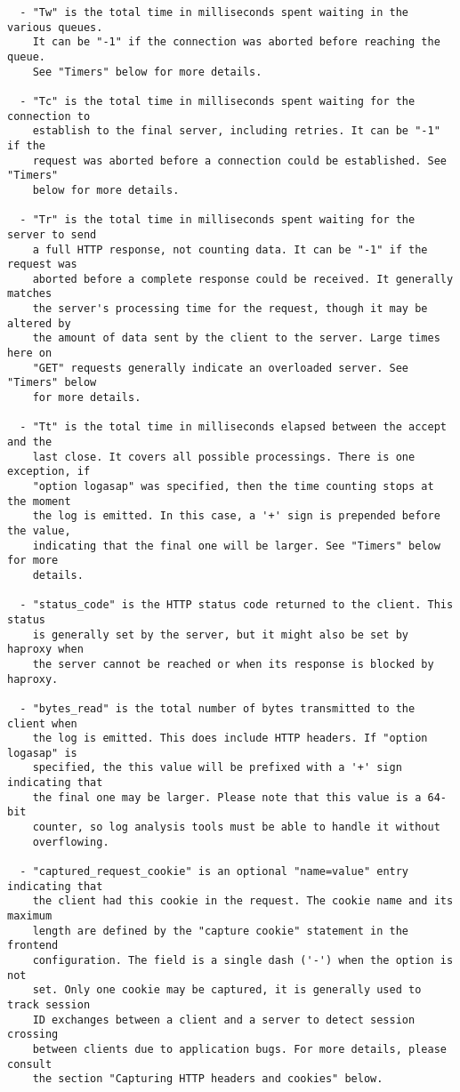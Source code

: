 \begin{verbatim}
  - "Tw" is the total time in milliseconds spent waiting in the various queues.
    It can be "-1" if the connection was aborted before reaching the queue.
    See "Timers" below for more details.

  - "Tc" is the total time in milliseconds spent waiting for the connection to
    establish to the final server, including retries. It can be "-1" if the
    request was aborted before a connection could be established. See "Timers"
    below for more details.

  - "Tr" is the total time in milliseconds spent waiting for the server to send
    a full HTTP response, not counting data. It can be "-1" if the request was
    aborted before a complete response could be received. It generally matches
    the server's processing time for the request, though it may be altered by
    the amount of data sent by the client to the server. Large times here on
    "GET" requests generally indicate an overloaded server. See "Timers" below
    for more details.

  - "Tt" is the total time in milliseconds elapsed between the accept and the
    last close. It covers all possible processings. There is one exception, if
    "option logasap" was specified, then the time counting stops at the moment
    the log is emitted. In this case, a '+' sign is prepended before the value,
    indicating that the final one will be larger. See "Timers" below for more
    details.

  - "status_code" is the HTTP status code returned to the client. This status
    is generally set by the server, but it might also be set by haproxy when
    the server cannot be reached or when its response is blocked by haproxy.

  - "bytes_read" is the total number of bytes transmitted to the client when
    the log is emitted. This does include HTTP headers. If "option logasap" is
    specified, the this value will be prefixed with a '+' sign indicating that
    the final one may be larger. Please note that this value is a 64-bit
    counter, so log analysis tools must be able to handle it without
    overflowing.

  - "captured_request_cookie" is an optional "name=value" entry indicating that
    the client had this cookie in the request. The cookie name and its maximum
    length are defined by the "capture cookie" statement in the frontend
    configuration. The field is a single dash ('-') when the option is not
    set. Only one cookie may be captured, it is generally used to track session
    ID exchanges between a client and a server to detect session crossing
    between clients due to application bugs. For more details, please consult
    the section "Capturing HTTP headers and cookies" below.


\end{verbatim}
